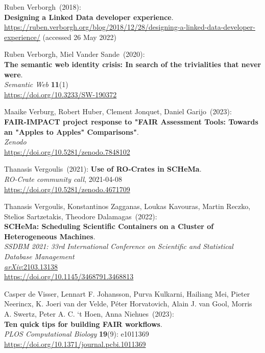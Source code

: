 \begin{thebibliography}{9}
Ruben Verborgh~(2018): \\
\textbf{Designing a {Linked Data} developer experience}.\\
\url{https://ruben.verborgh.org/blog/2018/12/28/designing-a-linked-data-developer-experience/}
(accessed 26 May 2022)

Ruben Verborgh, Miel Vander Sande~(2020): \\
\textbf{The semantic web identity crisis: In search of the trivialities that never were}.\\
\emph{Semantic Web} \textbf{11}(1)\\
\url{https://doi.org/10.3233/SW-190372}

Maaike Verburg, Robert Huber, Clement Jonquet, Daniel Garijo~(2023): \\
\textbf{{FAIR-IMPACT project response to "FAIR Assessment Tools: Towards an "Apples to Apples" Comparisons"}}.\\
\emph{Zenodo}\\
\url{https://doi.org/10.5281/zenodo.7848102}

Thanasis Vergoulis~(2021):   \textbf{Use of RO-Crates in SCHeMa}.\\
\emph{RO-Crate community call}, 2021-04-08\\
\url{https://doi.org/10.5281/zenodo.4671709}

Thanasis Vergoulis, Konstantinos Zagganas, Loukas Kavouras, Martin Reczko, Stelios Sartzetakis, Theodore Dalamagas~(2022): \\
\textbf{SCHeMa: Scheduling Scientific Containers on a Cluster of Heterogeneous Machines}.\\
\emph{SSDBM 2021: 33rd International Conference on Scientific and Statistical Database Management}\\
\href{https://doi.org/10.48550/arXiv.2103.13138}{\emph{arXiv}:2103.13138}\\
\url{https://doi.org/10.1145/3468791.3468813}

Casper de Visser, Lennart F. Johansson, Purva Kulkarni, Hailiang Mei, Pieter Neerincx, K. Joeri van der Velde, Péter Horvatovich, Alain J. van Gool, Morris A. Swertz, Peter A. C. ‘t Hoen, Anna Niehues~(2023):\\
\textbf{Ten quick tips for building FAIR workflows}.\\
\emph{PLOS Computational Biology} \textbf{19}(9): e1011369\\
\url{https://doi.org/10.1371/journal.pcbi.1011369}


\end{thebibliography}
